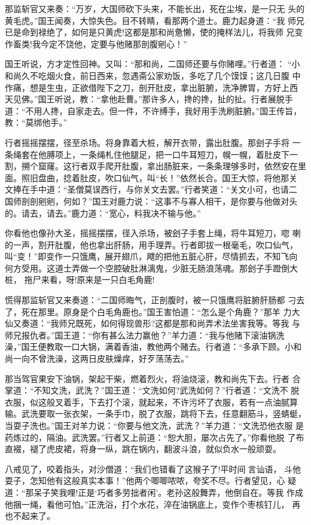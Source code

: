 那监斩官又来奏：“万岁，大国师砍下头来，不能长出，死在尘埃，是一只无
头的黄毛虎。”国王闻奏，大惊失色。目不转睛，看那两个道士。鹿力起身道：“我
师兄已是命到禄绝了，如何是只黄虎!这都是那和尚惫懒，使的掩样法儿，将我师
兄变作畜类!我今定不饶他，定要与他赌那剖腹剜心！”

国王听说，方才定性回神。又叫：“那和尚，二国师还要与你赌哩。”行者道：
“小和尚久不吃烟火食，前日西来，忽遇斋公家劝饭，多吃了几个馍馍；这几日腹
中作痛，想是生虫，正欲借陛下之刀，剖开肚皮，拿出脏腑，洗净脾胃，方好上西
天见佛。”国王听说，教：“拿他赴曹。”那许多人，搀的搀，扯的扯。行者展脱手
道：“不用人搀，自家走去。但一件，不许缚手，我好用手洗刷脏腑。”国王传旨，
教：“莫绑他手。”

行者摇摇摆摆，径至杀场。将身靠着大桩，解开衣带，露出肚腹。那刽子手将
一条绳套在他膊项上，一条绳札住他腿足，把一口牛耳短刀，幌一幌，着肚皮下一
割，搠个窟窿。这行者双手爬开肚腹，拿出肠脏来，一条条理够多时，依然安在里
面。照旧盘曲，捻着肚皮，吹口仙气，叫“长！”依然长合。国王大惊，将他那关
文捧在手中道：“圣僧莫误西行，与你关文去罢。”行者笑道：“关文小可，也请二
国师剖剖剜剜，何如？”国王对鹿力说：“这事不与寡人相干，是你要与他做对头
的。请去，请去。”鹿力道：“宽心，料我决不输与他。”

你看他也像孙大圣，摇摇摆摆，径入杀场，被刽子手套上绳，将牛耳短刀，唿
喇的一声，割开肚腹，他也拿出肝肠，用手理弄。行者即拔一根毫毛，吹口仙气，
叫“变！”即变作一只饿鹰，展开翅爪，飕的把他五脏心肝，尽情抓去，不知飞向
何方受用。这道士弄做一个空腔破肚淋漓鬼，少脏无肠浪荡魂。那刽子手蹬倒大桩，
拖尸来看，呀!原来是一只白毛角鹿!

慌得那监斩官又来奏道：“二国师晦气，正剖腹时，被一只饿鹰将脏腑肝肠都
刁去了，死在那里。原身是个白毛角鹿也。”国王害怕道：“怎么是个角鹿？”那羊
力大仙又奏道：“我师兄既死，如何得现兽形?这都是那和尚弄术法坐害我等。等我
与师兄报仇者。”国王道：“你有甚么法力赢他？”羊力道：“我与他赌下滚油锅洗
澡，”国王便教取一口大锅，满着香油，教他两个赌去。行者道：“多承下顾。小和
尚一向不曾洗澡，这两日皮肤燥痒，好歹荡荡去。”

那当驾官果安下油锅，架起干柴，燃着烈火，将油烧滚，教和尚先下去。行者
合掌道：“不知文洗，武洗？”国王道：“文洗如何?武洗如何？”行者道：“文洗不
脱衣服，似这般叉着手，下去打个滚，就起来，不许污坏了衣服，若有一点油腻算
输。武洗要取一张衣架，一条手巾，脱了衣服，跳将下去，任意翻筋斗，竖蜻蜓，
当耍子洗也。”国王对羊力说：“你要与他文洗，武洗？”羊力道：“文洗恐他衣服
是药炼过的，隔油。武洗罢。”行者又上前道：“恕大胆，屡次占先了。”你看他脱
了布直裰，褪了虎皮裙，将身一纵，跳在锅内，翻波斗浪，就似负水一般顽耍。

八戒见了，咬着指头，对沙僧道：“我们也错看了这猴子了!平时间言讪语，
斗他耍子，怎知他有这般真实本事！”他两个唧唧哝哝，夸奖不尽。行者望见，心
疑道：“那呆子笑我哩!正是‘巧者多劳拙者闲’。老孙这般舞弄，他倒自在。等我
作成他捆一绳，看他可怕。”正洗浴，打个水花，淬在油锅底上，变作个枣核钉儿，
再也不起来了。

